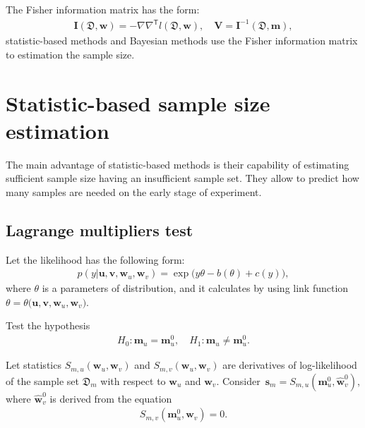 \documentclass[
11pt,%
tightenlines,%
twoside,%
onecolumn,%
nofloats,%
nobibnotes,%
nofootinbib,%
superscriptaddress,%
noshowpacs,%
centertags]%
{revtex4}
\begin{document}
The Fisher information matrix has the form:
\begin{equation}
\label{eq:ps:6}
\begin{aligned}
	\textbf{I}\left(\mathfrak{D}, \textbf{w}\right) = -\nabla\nabla^{\mathsf{T}}l\left(\mathfrak{D}, \textbf{w}\right), \quad  \textbf{V} = \textbf{I}^{-1}\left(\mathfrak{D}, \textbf{m}\right),
\end{aligned}
\end{equation}
statistic-based methods and Bayesian methods use the Fisher information matrix to estimation the sample size.

\section{Statistic-based sample size estimation}
The main advantage of statistic-based methods is their capability of estimating sufficient sample size having an insufficient sample set. They allow to predict how many samples are needed on the early stage of experiment.

\subsection{Lagrange multipliers test}
Let the likelihood has the following form:
\begin{equation}
\label{eq:sb:1}
\begin{aligned}
	p(y|\textbf{u},\textbf{v},\textbf{w}_{u},\textbf{w}_{v}) = \exp\bigl(y\theta- b(\theta) + c\left(y\right)\bigr),
\end{aligned}
\end{equation}
where $\theta$ is a parameters of distribution, and it calculates by using link function $\theta=\theta\bigr(\textbf{u},\textbf{v},\textbf{w}_{u},\textbf{w}_{v}\bigr)$.

Test the hypothesis
\begin{equation}
\label{eq:sb:2}
\begin{aligned}
	H_0: \textbf{m}_{u} = \textbf{m}^0_{u}, \quad H_1: \textbf{m}_{u} \not= \textbf{m}^0_{u}.
\end{aligned}
\end{equation}

Let statistics $S_{m,u}\left(\textbf{w}_{u}, \textbf{w}_{v}\right)$ and $S_{m,v}\left(\textbf{w}_{u}, \textbf{w}_{v}\right)$ are derivatives of log-likelihood of the sample set $\mathfrak{D}_{m}$ with respect to $\textbf{w}_{u}$ and $\textbf{w}_{v}$.
Consider~$\textbf{s}_{m} = S_{m,u}\left(\textbf{m}^{0}_{u}, \hat{\textbf{w}}^{0}_{v}\right)$, where $\hat{\textbf{w}}^{0}_{v}$ is derived from the equation
\begin{equation}
\label{eq:sb:3}
\begin{aligned}
	S_{m,v}\left(\textbf{m}^{0}_{u}, \textbf{w}_{v}\right) = 0.
\end{aligned}
\end{equation}
\end{document}
